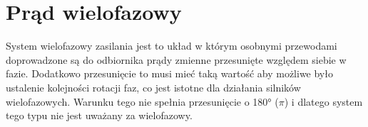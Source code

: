 % 
% 
% 
% 

\section{Prąd wielofazowy}

System wielofazowy zasilania jest to układ w którym osobnymi przewodami doprowadzone są do odbiornika prądy zmienne przesunięte względem siebie w fazie.
Dodatkowo przesunięcie to musi mieć taką wartość aby możliwe było ustalenie kolejności rotacji faz, co jest istotne dla działania silników wielofazowych.
Warunku tego nie spełnia przesunięcie o 180° ($\pi$) i dlatego system tego typu nie jest uważany za wielofazowy.

\newcommand{\twofourPhase}[9] {
	\begin{adjustbox}{scale=0.43}
	\begin{tikzpicture}
		\tikzstyle{fullrotate}=[rotate=##1,nodes={rotate=##1}]
		\tikzstyle{coil}=[align=center, minimum height=0.7cm, minimum width=0.7cm, fill=##1]
		
		\node[coil=#1] at (0,1.7) {#5};
		\node[coil=#2] at (1.7,0) {#6};
		
		\node[coil=#3] at (0,-1.7) {#7};
		\node[coil=#4] at (-1.7,0) {#8};
		
		\node[coil=none] at (0,1.9) {};
		
		\begin{scope}[fullrotate=#9]
			\fill[blue] (-1,-0.35) rectangle (0,0.35);
			\node at (-0.5,0) {N};
			\fill[red] (0,-0.35) rectangle (1,0.35);
			\node at (0.5,0) {S};
		\end{scope}
	\end{tikzpicture}
	\end{adjustbox}
}
\newcommand{\twoPhase}[3] {
	\twofourPhase{#1}{#2}{none}{none}{A}{B}{}{}{#3}
}
\newcommand{\fourPhase}[5] {
	\twofourPhase{#1}{#2}{#3}{#4}{A}{B}{A'}{B'}{#5}
}

